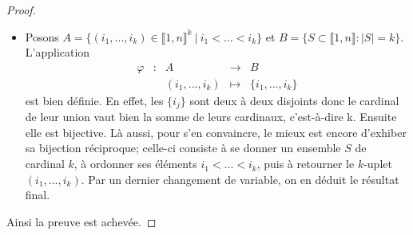 \documentclass[french]{book}
\theoremstyle{plain}
\theoremstyle{definition}
\theoremstyle{remark}
\begin{document}
\begin{proof}
\begin{itemize}
		\item Posons $A=\{(i_{1},...,i_{k})\in\llbracket1,n\rrbracket^{k}\ |\ i_{1}<...<i_{k}\}$ et $B=\{S\subset\llbracket1,n\rrbracket:|S|=k\}$. L'application $$
		\begin{array}{ccccc}
			\varphi&:&A&\rightarrow&B\\
			&&(i_{1},...,i_{k})&\mapsto&\{i_{1},...,i_{k}\}
		\end{array}$$ est bien définie. En effet, les $\{i_{j}\}$ sont deux à deux disjoints donc le cardinal de leur union vaut bien la somme de leurs cardinaux, c'est-à-dire k. Ensuite elle est bijective. Là aussi, pour s'en convaincre, le mieux est encore d'exhiber sa bijection réciproque; celle-ci consiste à se donner un ensemble $S$ de cardinal $k$, à ordonner ses éléments $i_{1}<...<i_{k}$, puis à retourner le $k$-uplet $(i_{1},...,i_{k})$. Par un dernier changement de variable, on en
		déduit le résultat final.
	\end{itemize}
Ainsi la preuve est achevée.
\end{proof}
\end{document}
